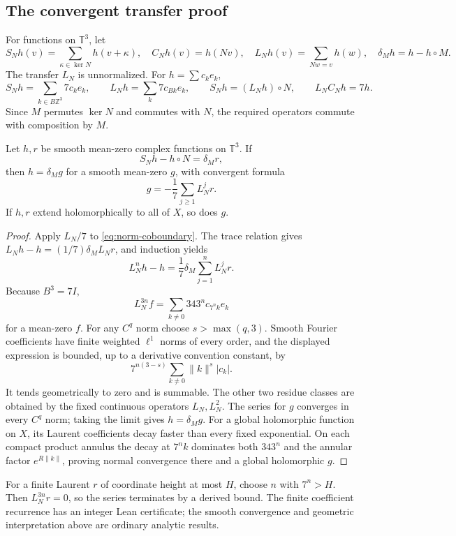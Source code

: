 \subsection{The convergent transfer proof}
For functions on $\mathbb T^3$, let
\[
 S_Nh(v)=\sum_{\kappa\in\ker N}h(v+\kappa),\quad
 C_Nh(v)=h(Nv),\quad L_Nh(v)=\sum_{Nw=v}h(w),\quad
 \delta_Mh=h-h\circ M.
\]
The transfer $L_N$ is unnormalized. For $h=\sum c_ke_k$,
\[
 S_Nh=\sum_{k\in B\mathbb Z^3}7c_ke_k,\qquad
 L_Nh=\sum_k7c_{Bk}e_k,\qquad S_Nh=(L_Nh)\circ N,
 \qquad L_NC_Nh=7h.
\]
Since $M$ permutes $\ker N$ and commutes with $N$, the required operators commute with composition by $M$.

\begin{theorem}\label{thm:principal-rigidity}
Let $h,r$ be smooth mean-zero complex functions on $\mathbb T^3$. If
\begin{equation}\label{eq:norm-coboundary}
 S_Nh-h\circ N=\delta_Mr,
\end{equation}
then $h=\delta_Mg$ for a smooth mean-zero $g$, with convergent formula
\[
 g=-\frac17\sum_{j\ge1}L_N^jr.
\]
If $h,r$ extend holomorphically to all of $X$, so does $g$.
\end{theorem}
\begin{proof}
Apply $L_N/7$ to \eqref{eq:norm-coboundary}. The trace relation gives $L_Nh-h=(1/7)\delta_M L_Nr$, and induction yields
\[
 L_N^nh-h=\frac17\delta_M\sum_{j=1}^{n}L_N^jr.
\]
Because $B^3=7I$,
\[
 L_N^{3n}f=\sum_{k\ne0}343^nc_{7^nk}e_k
\]
for a mean-zero $f$. For any $C^q$ norm choose $s>\max(q,3)$. Smooth Fourier coefficients have finite weighted $\ell^1$ norms of every order, and the displayed expression is bounded, up to a derivative convention constant, by
\[
 7^{n(3-s)}\sum_{k\ne0}\|k\|^s|c_k|.
\]
It tends geometrically to zero and is summable. The other two residue classes are obtained by the fixed continuous operators $L_N,L_N^2$. The series for $g$ converges in every $C^q$ norm; taking the limit gives $h=\delta_Mg$. For a global holomorphic function on $X$, its Laurent coefficients decay faster than every fixed exponential. On each compact product annulus the decay at $7^nk$ dominates both $343^n$ and the annular factor $e^{R\|k\|}$, proving normal convergence there and a global holomorphic $g$.
\end{proof}
For a finite Laurent $r$ of coordinate height at most $H$, choose $n$ with $7^n>H$. Then $L_N^{3n}r=0$, so the series terminates by a derived bound. The finite coefficient recurrence has an integer Lean certificate; the smooth convergence and geometric interpretation above are ordinary analytic results.

